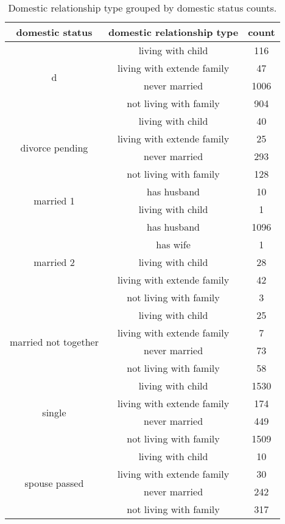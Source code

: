 \begin{table}[!h]
    \caption{Domestic relationship type grouped by domestic status counts.}
    \label{tab:domestic_type_by_status_counts}
    \centering
    \begin{tabular}{ccc}
        domestic status      & domestic relationship type & count  \\
        \hline
        \multirow{4}{*}{d}   & living with child          &    116 \\
        & living with extende family &     47 \\
        & never married              &   1006 \\
        & not living with family     &    904 \\
        \multirow{4}{*}{divorce pending} & living with child          &     40 \\
        & living with extende family &     25 \\
        & never married              &    293 \\
        & not living with family     &    128 \\
        \multirow{2}{*}{married 1} & has husband                &     10 \\
        & living with child          &      1 \\
        \multirow{5}{*}{married 2} & has husband                &   1096 \\
        & has wife                   &      1 \\
        & living with child          &     28 \\
        & living with extende family &     42 \\
        & not living with family     &      3 \\
        \multirow{4}{*}{married not together} & living with child          &     25 \\
        & living with extende family &      7 \\
        & never married              &     73 \\
        & not living with family     &     58 \\
        \multirow{4}{*}{single} & living with child          &   1530 \\
        & living with extende family &    174 \\
        & never married              &    449 \\
        & not living with family     &   1509 \\
        \multirow{4}{*}{spouse passed} & living with child          &     10 \\
        & living with extende family &     30 \\
        & never married              &    242 \\
        & not living with family     &    317 \\
    \end{tabular}
\end{table}

